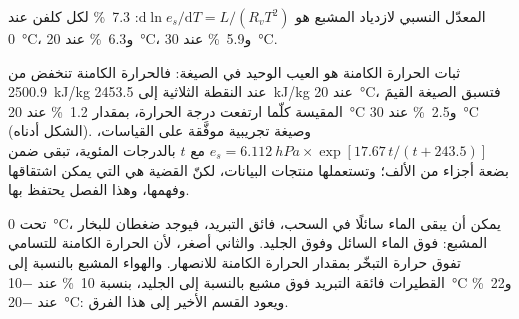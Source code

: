 \begin{corollary}\label{cor:b2:atmospheric-thermodynamics:seven}
المعدّل النسبي لازدياد  المشبع هو
$\mathrm{d}\ln e_s/\mathrm{d}T = L/(R_v T^2)$: \qty{7.3}{\percent} لكل كلفن عند
\qty{0}{\celsius}، و\qty{6.3}{\percent} عند \qty{20}{\celsius}، و\qty{5.9}{\percent} عند
\qty{30}{\celsius}.
\end{corollary}

ثبات الحرارة الكامنة هو العيب الوحيد في الصيغة: فالحرارة الكامنة تنخفض من
\qty{2500.9}{kJ/kg} عند النقطة الثلاثية إلى \qty{2453.5}{kJ/kg} عند \qty{20}{\celsius}، فتسبق
الصيغة القيمَ المقيسة كلّما ارتفعت درجة الحرارة، بمقدار \qty{1.2}{\percent} عند
\qty{20}{\celsius} و\qty{2.5}{\percent} عند \qty{30}{\celsius} (الشكل أدناه). وصيغة
تجريبية موفَّقة على القياسات، $e_s = \qty{6.112}{hPa} \times \exp[17.67\,t/(t + 243.5)]$ مع
$t$ بالدرجات المئوية، تبقى ضمن بضعة أجزاء من الألف؛ وتستعملها منتجات البيانات، لكنّ
القضية هي التي يمكن اشتقاقها وفهمها، وهذا الفصل يحتفظ بها.

تحت \qty{0}{\celsius}، يمكن أن يبقى الماء سائلًا في السحب، فائق التبريد، فيوجد ضغطان
للبخار المشبع: فوق الماء السائل وفوق الجليد. والثاني أصغر، لأن الحرارة الكامنة
للتسامي تفوق حرارة التبخّر بمقدار الحرارة الكامنة للانصهار. والهواء المشبع
بالنسبة إلى القطيرات فائقة التبريد فوق مشبع بالنسبة إلى الجليد، بنسبة \qty{10}{\percent} عند
\qty{-10}{\celsius} و\qty{22}{\percent} عند \qty{-20}{\celsius}: ويعود القسم الأخير إلى
هذا الفرق.

